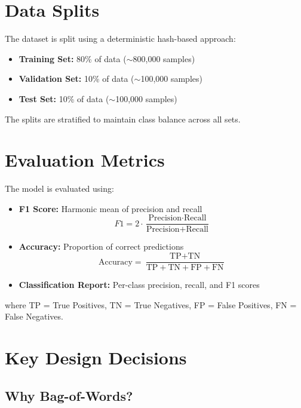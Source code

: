 \documentclass[11pt,a4paper]{article}
\begin{document}
\section{Data Splits}

The dataset is split using a deterministic hash-based approach:

\begin{itemize}
    \item \textbf{Training Set:} 80\% of data ($\sim$800,000 samples)
    \item \textbf{Validation Set:} 10\% of data ($\sim$100,000 samples)
    \item \textbf{Test Set:} 10\% of data ($\sim$100,000 samples)
\end{itemize}

The splits are stratified to maintain class balance across all sets.

\section{Evaluation Metrics}

The model is evaluated using:

\begin{itemize}
    \item \textbf{F1 Score:} Harmonic mean of precision and recall
    \begin{equation}
    F1 = 2 \cdot \frac{\text{Precision} \cdot \text{Recall}}{\text{Precision} + \text{Recall}}
    \end{equation}
    
    \item \textbf{Accuracy:} Proportion of correct predictions
    \begin{equation}
    \text{Accuracy} = \frac{\text{TP} + \text{TN}}{\text{TP} + \text{TN} + \text{FP} + \text{FN}}
    \end{equation}
    
    \item \textbf{Classification Report:} Per-class precision, recall, and F1 scores
\end{itemize}

where TP = True Positives, TN = True Negatives, FP = False Positives, FN = False Negatives.

\section{Key Design Decisions}

\subsection{Why Bag-of-Words?}
\end{document}
